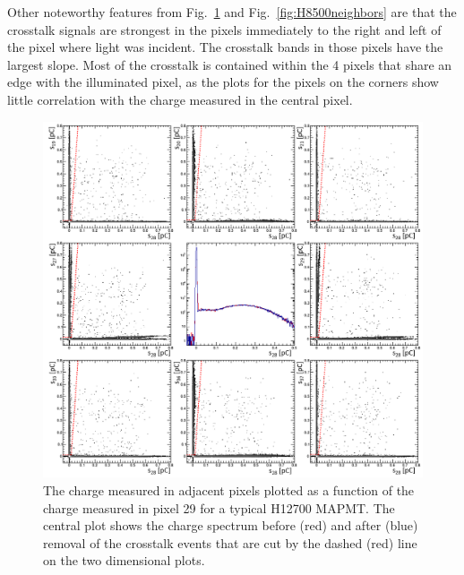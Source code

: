 Other noteworthy features from Fig.~\ref{fig:H12700neighbors} and Fig.~\ref{fig:H8500neighbors} are that the crosstalk signals are strongest in the pixels immediately to the right and left of the pixel where light was incident. The crosstalk bands in those pixels have the largest slope. Most of the crosstalk is contained within the 4 pixels that share an edge with the illuminated pixel, as the plots for the pixels on the corners show little correlation with the charge measured in the central pixel.

\begin{figure}[hbt]
	\centering
	\includegraphics[width=\linewidth]{figures/H12700_ct.png}
	\caption{The charge measured in adjacent pixels plotted as a function of the charge measured in pixel 29 for a typical H12700 MAPMT. The central plot shows the charge spectrum before (red) and after (blue) removal of the crosstalk events that are cut by the dashed (red) line on the two dimensional plots.}
	\label{fig:H12700neighbors}
\end{figure}
